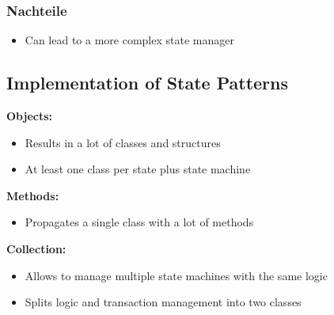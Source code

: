 \subsubsection{Nachteile}
\begin{itemize}[topsep=0pt]
    \itemsep -0.4em
    \item Can lead to a more complex state manager
\end{itemize}

\subsection{Implementation of State Patterns}
\textbf{Objects:} 
\begin{itemize}[topsep=0pt]
    \itemsep -0.4em
    \item Results in a lot of classes and structures
    \item At least one class per state plus state machine
\end{itemize}
\textbf{Methods:}
\begin{itemize}[topsep=0pt]
    \itemsep -0.4em
    \item Propagates a single class with a lot of methods
\end{itemize}
\textbf{Collection:}
\begin{itemize}[topsep=0pt]
    \itemsep -0.4em
    \item Allows to manage multiple state machines with the same logic
    \item Splits logic and transaction management into two classes
\end{itemize}